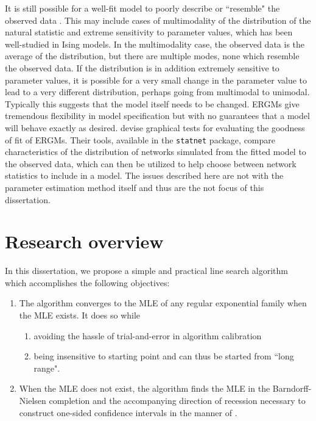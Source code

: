 It is still possible for a well-fit model to poorly describe or ``resemble" the 
observed data \citep{Handcock:degeneracy,ergm}.  This may include cases of multimodality of 
the distribution of the natural statistic and extreme sensitivity to parameter
values, which has been well-studied in Ising models. 
In the multimodality case, the observed data is the average
of the distribution, but there are multiple modes, none which resemble the observed
data.  If the distribution is in addition extremely sensitive to parameter values,
it is possible for a very small change in the parameter value to lead to a 
very different distribution, perhaps going from multimodal to unimodal.
Typically this suggests that the model itself
needs to be changed.  ERGMs give tremendous
flexibility in model specification but with no guarantees that a model will behave exactly as desired.  \citet*{GOF} devise graphical tests for evaluating the goodness of fit of ERGMs.
Their tools, available in the \texttt{statnet} package, compare characteristics of 
the distribution of networks simulated from the fitted model to the observed data, 
which can then be utilized to help choose between network statistics to include in a 
model. The issues described here are not with the parameter estimation method 
itself and thus are the not focus of this dissertation.  


\section{Research overview} \label{S:Research overview}
In this dissertation, we propose a simple and practical line search algorithm which
accomplishes the following objectives:
\begin{enumerate}
\item The algorithm converges to the MLE of any regular exponential family 
when the MLE exists.  It does so while
\begin{enumerate}
	\item avoiding the hassle of trial-and-error in algorithm calibration
	\item being insensitive to starting point and can thus be started from ``long range".
\end{enumerate}
\item When the MLE does not exist, the algorithm finds the MLE in the Barndorff-Nielsen completion and the 
accompanying direction of recession necessary to construct one-sided 
confidence intervals in the manner of \citet{Geyer:gdor}.
\end{enumerate}

